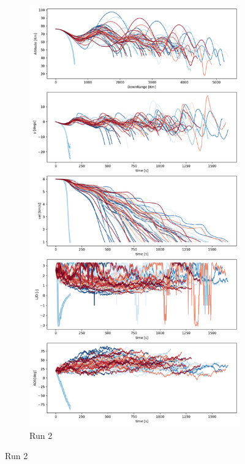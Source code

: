 \documentclass[11pt]{article} %
\begin{document}
\begin{figure}[H]
   \begin{subfigure}[b]{0.5\textwidth}
     \centering
     \includegraphics[width=\textwidth]{images/run_2.png}
     \caption{ Run 2}
     \label{fig:run_2}


\end{subfigure}
\end{figure}
\end{document}
